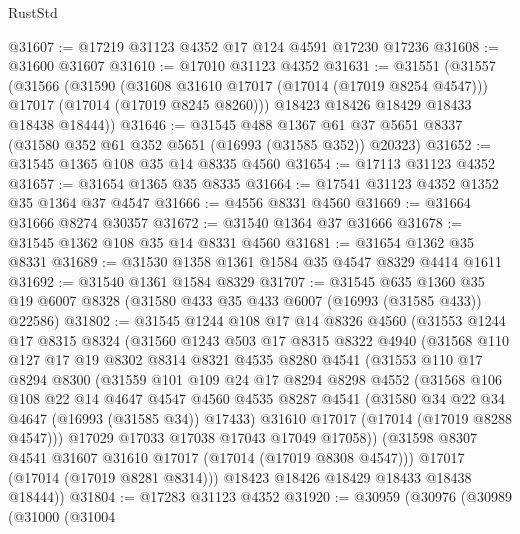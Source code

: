 \begin{lexlean}{RustStd}
\begin{coremodule}
{\begin{coremodule}
{{{{{{{{{{{{{{{{{{{{{{{{{{{{{{{{{{{{{{{{{{{{{{{{{{{{{{{@31607 := @17219 @31123 @4352 @17 @124 @4591 @17230 @17236
@31608 := @31600 @31607
@31610 := @17010 @31123 @4352
@31631 := @31551
    (@31557
      (@31566
        (@31590
          (@31608 @31610 @17017 (@17014 (@17019 @8254 @4547)))
          @17017
          (@17014 (@17019 @8245 @8260)))
        @18423
        @18426
        @18429
        @18433
        @18438
        @18444))
@31646 := @31545
    @488
    @1367
    @61
    @37
    @5651
    @8337
    (@31580 @352 @61 @352 @5651 (@16993 (@31585 @352)) @20323)
@31652 := @31545 @1365 @108 @35 @14 @8335 @4560
@31654 := @17113 @31123 @4352
@31657 := @31654 @1365 @35 @8335
@31664 := @17541 @31123 @4352 @1352 @35 @1364 @37 @4547
@31666 := @4556 @8331 @4560
@31669 := @31664 @31666 @8274 @30357
@31672 := @31540 @1364 @37 @31666
@31678 := @31545 @1362 @108 @35 @14 @8331 @4560
@31681 := @31654 @1362 @35 @8331
@31689 := @31530 @1358 @1361 @1584 @35 @4547 @8329 @4414 @1611
@31692 := @31540 @1361 @1584 @8329
@31707 := @31545
    @635
    @1360
    @35
    @19
    @6007
    @8328
    (@31580 @433 @35 @433 @6007 (@16993 (@31585 @433)) @22586)
@31802 := @31545
    @1244
    @108
    @17
    @14
    @8326
    @4560
    (@31553
      @1244
      @17
      @8315
      @8324
      (@31560
        @1243
        @503
        @17
        @8315
        @8322
        @4940
        (@31568
          @110
          @127
          @17
          @19
          @8302
          @8314
          @8321
          @4535
          @8280
          @4541
          (@31553
            @110
            @17
            @8294
            @8300
            (@31559
              @101
              @109
              @24
              @17
              @8294
              @8298
              @4552
              (@31568
                @106
                @108
                @22
                @14
                @4647
                @4547
                @4560
                @4535
                @8287
                @4541
                (@31580 @34 @22 @34 @4647 (@16993 (@31585 @34)) @17433)
                @31610
                @17017
                (@17014 (@17019 @8288 @4547)))
              @17029
              @17033
              @17038
              @17043
              @17049
              @17058))
          (@31598 @8307 @4541 @31607 @31610 @17017 (@17014 (@17019 @8308 @4547)))
          @17017
          (@17014 (@17019 @8281 @8314)))
        @18423
        @18426
        @18429
        @18433
        @18438
        @18444))
@31804 := @17283 @31123 @4352
@31920 := @30959
    (@30976
      (@30989
        (@31000
          (@31004
}}}}}}}}}}}}}}}}}}}}}}}}}}}}}}}}}}}}}}}}}}}}}}}}}}}}}}}
\end{coremodule}}
\end{coremodule}
\end{lexlean}

